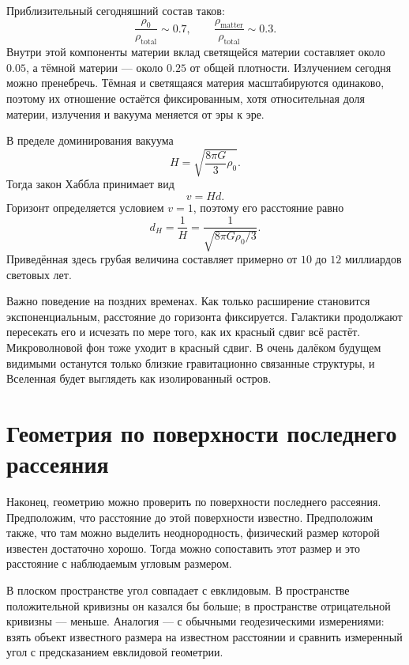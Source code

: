 Приблизительный сегодняшний состав таков:
\begin{equation}
\frac{\rho_0}{\rho_{\text{total}}}\sim 0.7,
\qquad
\frac{\rho_{\text{matter}}}{\rho_{\text{total}}}\sim 0.3.
\end{equation}
Внутри этой компоненты материи вклад светящейся материи составляет около \(0.05\), а тёмной материи — около \(0.25\) от общей плотности. Излучением сегодня можно пренебречь. Тёмная и светящаяся материя масштабируются одинаково, поэтому их отношение остаётся фиксированным, хотя относительная доля материи, излучения и вакуума меняется от эры к эре.

В пределе доминирования вакуума
\begin{equation}
H=\sqrt{\frac{8\pi G}{3}\rho_0}.
\end{equation}
Тогда закон Хаббла принимает вид
\begin{equation}
v=Hd.
\end{equation}
Горизонт определяется условием \(v=1\), поэтому его расстояние равно
\begin{equation}
d_H=\frac{1}{H}
=
\frac{1}{\sqrt{8\pi G\rho_0/3}}.
\end{equation}
Приведённая здесь грубая величина составляет примерно от \(10\) до \(12\) миллиардов световых лет.

Важно поведение на поздних временах. Как только расширение становится экспоненциальным, расстояние до горизонта фиксируется. Галактики продолжают пересекать его и исчезать по мере того, как их красный сдвиг всё растёт. Микроволновой фон тоже уходит в красный сдвиг. В очень далёком будущем видимыми останутся только близкие гравитационно связанные структуры, и Вселенная будет выглядеть как изолированный остров.

\section{Геометрия по поверхности последнего рассеяния}

Наконец, геометрию можно проверить по поверхности последнего рассеяния. Предположим, что расстояние до этой поверхности известно. Предположим также, что там можно выделить неоднородность, физический размер которой известен достаточно хорошо. Тогда можно сопоставить этот размер и это расстояние с наблюдаемым угловым размером.

В плоском пространстве угол совпадает с евклидовым. В пространстве положительной кривизны он казался бы больше; в пространстве отрицательной кривизны — меньше. Аналогия — с обычными геодезическими измерениями: взять объект известного размера на известном расстоянии и сравнить измеренный угол с предсказанием евклидовой геометрии.

